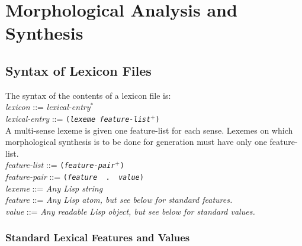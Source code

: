 \documentclass{book}
\begin{document}
\section{Morphological Analysis and Synthesis}

\subsection{Syntax of Lexicon Files} \label{lexsyntax-section}

The syntax of the contents of a lexicon file is: \\[2ex]
{\it lexicon} ::= {\it lexical-entry$^*$} \\[2ex]
{\it lexical-entry} ::= {\tt ({\it lexeme feature-list$^+$})} \\
A multi-sense lexeme is given one feature-list for each sense.  Lexemes on which morphological
synthesis is to be done for generation must have only one feature-list.\\[2ex]
{\it feature-list} ::= {\tt ({\it feature-pair$^+$})}
\\[2ex] {\it feature-pair} ::= {\tt ({\it feature} \verb| . | {\it value})} \\[2ex]
{\it lexeme} ::= {\it Any Lisp string} \\[2ex]
{\it feature} ::= {\it Any Lisp atom, but see below for standard features.} \\[2ex]
{\it value} ::= {\it Any readable Lisp object, but see below for standard values.}

\subsubsection{Standard Lexical Features and Values}
\end{document}
